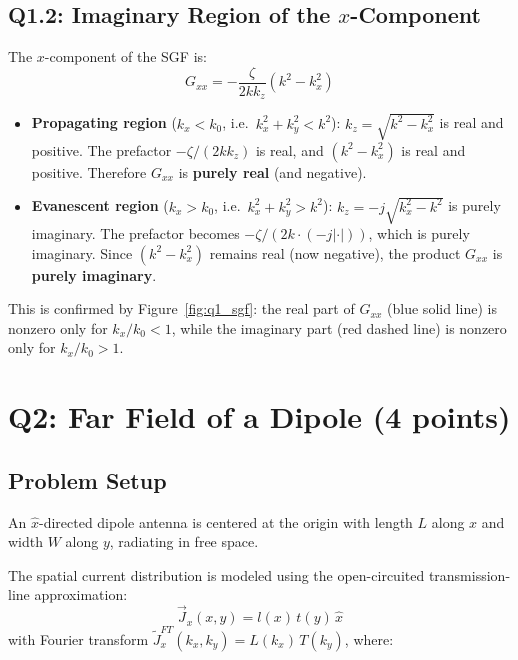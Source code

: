 \documentclass{article}
\begin{document}
\subsection{Q1.2: Imaginary Region of the $x$-Component}

The $x$-component of the SGF is:
\begin{equation}
G_{xx} = -\frac{\zeta}{2kk_z}\left(k^2-k_x^2\right)
\end{equation}

\begin{itemize}
\item \textbf{Propagating region} ($k_x < k_0$, i.e.\ $k_x^2+k_y^2<k^2$): $k_z=\sqrt{k^2-k_x^2}$ is real and positive. The prefactor $-\zeta/(2kk_z)$ is real, and $(k^2-k_x^2)$ is real and positive. Therefore $G_{xx}$ is \textbf{purely real} (and negative).

\item \textbf{Evanescent region} ($k_x > k_0$, i.e.\ $k_x^2+k_y^2>k^2$): $k_z=-j\sqrt{k_x^2-k^2}$ is purely imaginary. The prefactor becomes $-\zeta/(2k\cdot(-j|\cdot|))$, which is purely imaginary. Since $(k^2-k_x^2)$ remains real (now negative), the product $G_{xx}$ is \textbf{purely imaginary}.
\end{itemize}

This is confirmed by Figure~\ref{fig:q1_sgf}: the real part of $G_{xx}$ (blue solid line) is nonzero only for $k_x/k_0<1$, while the imaginary part (red dashed line) is nonzero only for $k_x/k_0>1$.

\section{Q2: Far Field of a Dipole (4 points)}

\subsection{Problem Setup}

An $\hat{x}$-directed dipole antenna is centered at the origin with length $L$ along $x$ and width $W$ along $y$, radiating in free space.

The spatial current distribution is modeled using the open-circuited transmission-line approximation:
\begin{equation}
\vec{J}_x(x,y) = l(x)\,t(y)\,\hat{x}
\end{equation}
with Fourier transform $\tilde{J}_x^{FT}(k_x,k_y)=L(k_x)\,T(k_y)$, where:
\end{document}
